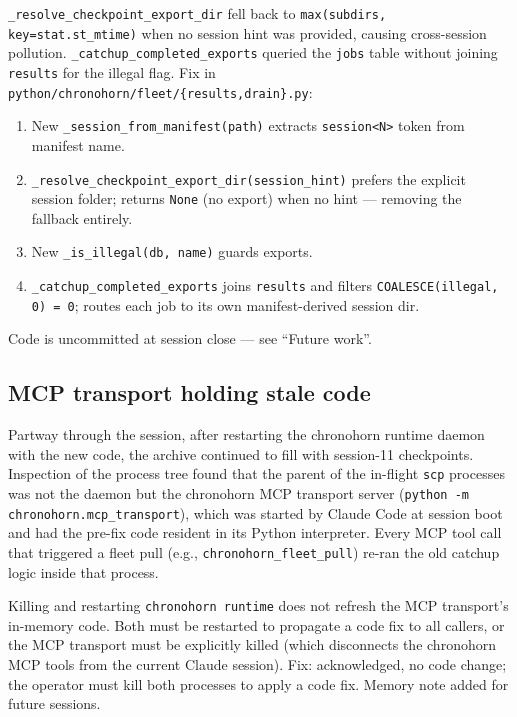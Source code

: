 \begin{bug}
\texttt{\_resolve\_checkpoint\_export\_dir} fell back to \texttt{max(subdirs, key=stat.st\_mtime)} when no session hint was provided, causing cross-session pollution. \texttt{\_catchup\_completed\_exports} queried the \texttt{jobs} table without joining \texttt{results} for the illegal flag. Fix in \texttt{python/chronohorn/fleet/\{results,drain\}.py}:
\begin{enumerate}
  \item New \texttt{\_session\_from\_manifest(path)} extracts \texttt{session<N>} token from manifest name.
  \item \texttt{\_resolve\_checkpoint\_export\_dir(session\_hint)} prefers the explicit session folder; returns \texttt{None} (no export) when no hint --- removing the fallback entirely.
  \item New \texttt{\_is\_illegal(db, name)} guards exports.
  \item \texttt{\_catchup\_completed\_exports} joins \texttt{results} and filters \texttt{COALESCE(illegal, 0) = 0}; routes each job to its own manifest-derived session dir.
\end{enumerate}
Code is uncommitted at session close --- see ``Future work''.
\end{bug}

\subsection{MCP transport holding stale code}

Partway through the session, after restarting the chronohorn runtime daemon with the new code, the archive continued to fill with session-11 checkpoints. Inspection of the process tree found that the parent of the in-flight \texttt{scp} processes was not the daemon but the chronohorn MCP transport server (\texttt{python -m chronohorn.mcp\_transport}), which was started by Claude Code at session boot and had the pre-fix code resident in its Python interpreter. Every MCP tool call that triggered a fleet pull (e.g., \texttt{chronohorn\_fleet\_pull}) re-ran the old catchup logic inside that process.

\begin{bug}
Killing and restarting \texttt{chronohorn runtime} does not refresh the MCP transport's in-memory code. Both must be restarted to propagate a code fix to all callers, or the MCP transport must be explicitly killed (which disconnects the chronohorn MCP tools from the current Claude session). Fix: acknowledged, no code change; the operator must kill both processes to apply a code fix. Memory note added for future sessions.
\end{bug}

